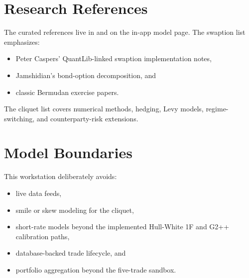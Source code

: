 \documentclass[11pt]{article}
\begin{document}
\section{Research References}
The curated references live in  and on the in-app model page. The swaption list emphasizes:
\begin{itemize}[leftmargin=1.5em]
    \item Peter Caspers' QuantLib-linked swaption implementation notes,
    \item Jamshidian's bond-option decomposition, and
    \item classic Bermudan exercise papers.
\end{itemize}
The cliquet list covers numerical methods, hedging, Levy models, regime-switching, and counterparty-risk extensions.

\section{Model Boundaries}
This workstation deliberately avoids:
\begin{itemize}[leftmargin=1.5em]
    \item live data feeds,
    \item smile or skew modeling for the cliquet,
    \item short-rate models beyond the implemented Hull-White 1F and G2++ calibration paths,
    \item database-backed trade lifecycle, and
    \item portfolio aggregation beyond the five-trade sandbox.
\end{itemize}
\end{document}

